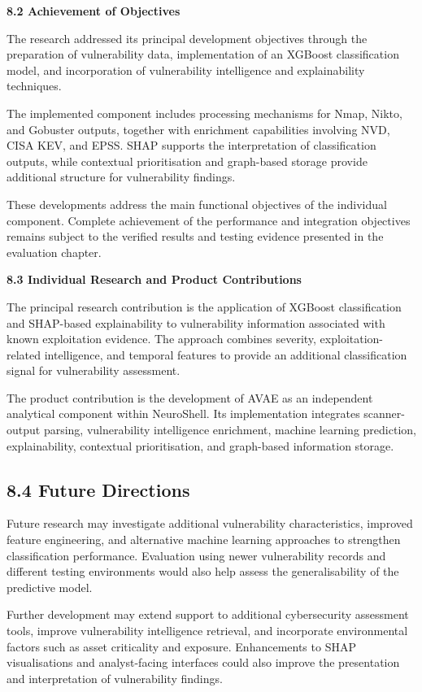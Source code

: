 \documentclass[
]{article}
\begin{document}
\textbf{8.2 Achievement of Objectives}

The research addressed its principal development objectives through the
preparation of vulnerability data, implementation of an XGBoost
classification model, and incorporation of vulnerability intelligence
and explainability techniques.

The implemented component includes processing mechanisms for Nmap,
Nikto, and Gobuster outputs, together with enrichment capabilities
involving NVD, CISA KEV, and EPSS. SHAP supports the interpretation of
classification outputs, while contextual prioritisation and graph-based
storage provide additional structure for vulnerability findings.

These developments address the main functional objectives of the
individual component. Complete achievement of the performance and
integration objectives remains subject to the verified results and
testing evidence presented in the evaluation chapter.

\textbf{8.3 Individual Research and Product Contributions}

The principal research contribution is the application of XGBoost
classification and SHAP-based explainability to vulnerability
information associated with known exploitation evidence. The approach
combines severity, exploitation-related intelligence, and temporal
features to provide an additional classification signal for
vulnerability assessment.

The product contribution is the development of AVAE as an independent
analytical component within NeuroShell. Its implementation integrates
scanner-output parsing, vulnerability intelligence enrichment, machine
learning prediction, explainability, contextual prioritisation, and
graph-based information storage.

\hypertarget{future-directions}{%
\subsection{8.4 Future Directions}\label{future-directions}}

Future research may investigate additional vulnerability
characteristics, improved feature engineering, and alternative machine
learning approaches to strengthen classification performance. Evaluation
using newer vulnerability records and different testing environments
would also help assess the generalisability of the predictive model.

Further development may extend support to additional cybersecurity
assessment tools, improve vulnerability intelligence retrieval, and
incorporate environmental factors such as asset criticality and
exposure. Enhancements to SHAP visualisations and analyst-facing
interfaces could also improve the presentation and interpretation of
vulnerability findings.
\end{document}

